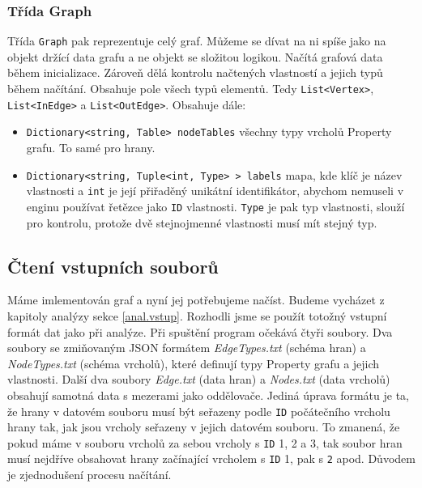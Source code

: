 \subsubsection{Třída Graph}

Třída \texttt{Graph} pak reprezentuje celý graf.
Můžeme se dívat na ni spíše jako na objekt držící data grafu a ne objekt se složitou logikou.
Načítá grafová data během inicializace.
Zároveň dělá kontrolu načtených vlastností a jejich typů během načítání.
Obsahuje pole všech typů elementů. Tedy \texttt{List<Vertex>}, \texttt{List<InEdge>} a \texttt{List<OutEdge>}.
Obsahuje dále:
\begin{itemize}
\item \texttt{Dictionary<string, Table> nodeTables} všechny typy vrcholů Property grafu. To samé pro hrany.
\item \texttt{Dictionary<string, Tuple<int, Type> > labels} mapa, kde klíč je název vlastnosti a \texttt{int} je její přiřaděný unikátní identifikátor, abychom nemuseli v enginu používat řetězce jako \texttt{ID} vlastnosti.
\texttt{Type} je pak typ vlastnosti, slouží pro kontrolu, protože dvě stejnojmenné vlastnosti musí mít stejný typ. 
\end{itemize}


\subsection{Čtení vstupních souborů}

Máme imlementován graf a nyní jej potřebujeme načíst.
Budeme vycházet z kapitoly analýzy sekce \ref{anal.vstup}.
Rozhodli jsme se použít totožný vstupní formát dat jako při analýze.
Při spuštění program očekává čtyři soubory.
Dva soubory se zmiňovaným JSON formátem \textit{EdgeTypes.txt} (schéma hran) a \textit{NodeTypes.txt} (schéma vrcholů), které definují typy Property grafu a jejich vlastnosti.
Další dva soubory \textit{Edge.txt} (data hran) a \textit{Nodes.txt} (data vrcholů) obsahují samotná data s mezerami jako oddělovače.
Jediná úprava formátu je ta, že hrany v datovém souboru musí být seřazeny podle \texttt{ID} počátečního vrcholu hrany tak, jak jsou vrcholy seřazeny v jejich datovém souboru.
To zmanená, že pokud máme v souboru vrcholů za sebou vrcholy s \texttt{ID} 1, 2 a 3, tak soubor hran musí nejdříve obsahovat hrany začínající vrcholem s \texttt{ID} 1, pak s \texttt{2} apod.
Důvodem je zjednodušení procesu načítání.

